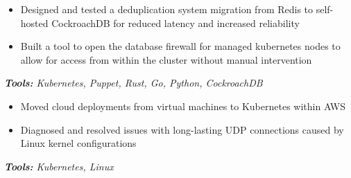 \documentclass[10pt,letter]{altacv}
\begin{document}

\begin{fullwidth}
\marginpar{\makesidebarheader}
    \vspace*{-1\baselineskip}
\makecvheader
\end{fullwidth}


\begin{itemize}
  \item Designed and tested a deduplication system migration from Redis to self-hosted CockroachDB for reduced latency and increased reliability
  \item Built a tool to open the database firewall for managed kubernetes nodes to allow for access from within the cluster without manual intervention
\end{itemize}
\textit{\textbf{Tools:} Kubernetes, Puppet, Rust, Go, Python, CockroachDB}


\begin{itemize}
  \item Moved cloud deployments from virtual machines to Kubernetes within AWS
  \item Diagnosed and resolved issues with long-lasting UDP connections caused by Linux kernel configurations
\end{itemize}
\textit{\textbf{Tools:} Kubernetes, Linux}

\end{document}
